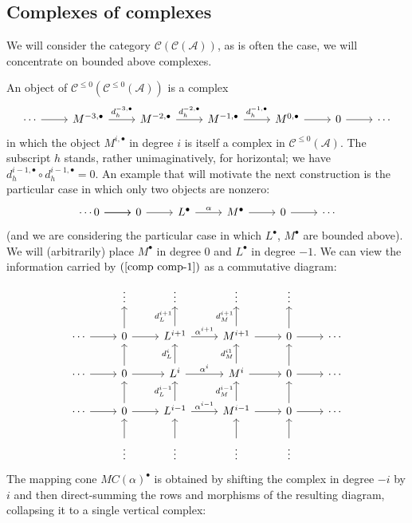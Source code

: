 \subsection{Complexes of complexes}
We will consider the category $\mathcal{C}(\mathcal{C}(\mathcal{A}))$, as is often the case, we will concentrate on bounded above complexes.\par
An object of $\mathcal{C}^{\leq0}(\mathcal{C}^{\leq0}(\mathcal{A}))$ is a complex
\[\begin{tikzcd}
\cdots\ar[r]&M^{-3,\bullet}\ar[r,"d_h^{-3,\bullet}"]&M^{-2,\bullet}\ar[r,"d_h^{-2,\bullet}"]&M^{-1,\bullet}\ar[r,"d_h^{-1,\bullet}"]&M^{0,\bullet}\ar[r]&0\ar[r]&\cdots
\end{tikzcd}\]
in which the object $M^{i,\bullet}$ in degree $i$ is itself a complex in $\mathcal{C}^{\leq0}(\mathcal{A})$. The subscript $h$ stands, rather unimaginatively, for horizontal; we have $d^{i-1,\bullet}_h\circ d^{i-1,\bullet}_h=0$. An example that will motivate the next construction is the particular case in which only two objects are nonzero:
\begin{equation}\label{comp comp-1}
\begin{tikzcd}
\cdots\ar[r]0\ar[r]&0\ar[r]&L^\bullet\ar[r,"\alpha"]&M^\bullet\ar[r]&0\ar[r]&\cdots
\end{tikzcd}
\end{equation}
(and we are considering the particular case in which $L^\bullet$, $M^\bullet$ are bounded above). We will (arbitrarily) place $M^\bullet$ in degree $0$ and $L^\bullet$ in degree $-1$. We can view the information carried by $(\ref{comp comp-1})$ as a commutative diagram:
\[\begin{tikzcd}
&\vdots&\vdots&\vdots&\vdots&\\
\cdots\ar[r]&0\ar[u]\ar[r]&L^{i+1}\ar[u,"d_L^{i+1}"]\ar[r,"\alpha^{i+1}"]&M^{i+1}\ar[u,"d_M^{i+1}"]\ar[r]&0\ar[u]\ar[r]&\cdots\\
\cdots\ar[r]&0\ar[u]\ar[r]&L^{i}\ar[u,"d_L^{i}"]\ar[r,"\alpha^{i}"]&M^{i}\ar[u,"d_M^{i1}"]\ar[r]&0\ar[u]\ar[r]&\cdots\\
\cdots\ar[r]&0\ar[u]\ar[r]&L^{i-1}\ar[u,"d_L^{i-1}"]\ar[r,"\alpha^{i-1}"]&M^{i-1}\ar[u,"d_M^{i-1}"]\ar[r]&0\ar[u]\ar[r]&\cdots\\
&\vdots\ar[u]&\vdots\ar[u]&\vdots\ar[u]&\vdots\ar[u]&
\end{tikzcd}\]
The mapping cone $MC(\alpha)^\bullet$ is obtained by shifting the complex in degree $-i$ by $i$
and then direct-summing the rows and morphisms of the resulting diagram, collapsing it to a single vertical complex:
